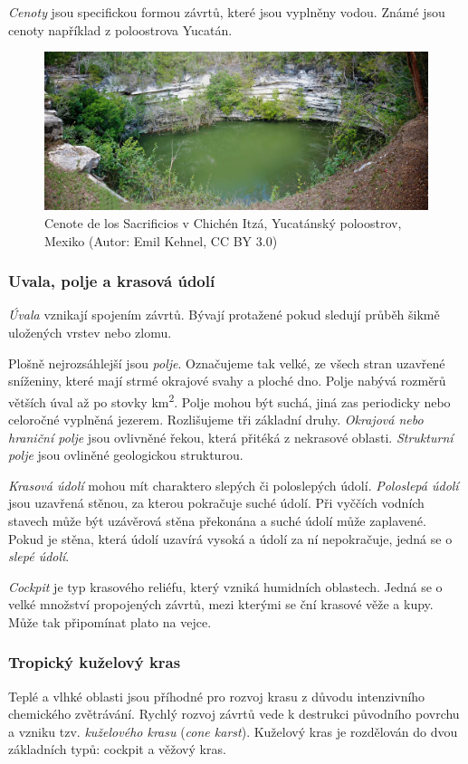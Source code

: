 \emph{Cenoty} jsou specifickou formou závrtů, které jsou vyplněny vodou. Známé jsou cenoty například z poloostrova Yucatán.

\begin{figure}[h]
	\centering
	\includegraphics[width=1\linewidth]{obrazky/karst/Mexico_Cenotes}
	\caption{Cenote de los Sacrificios v Chichén Itzá, Yucatánský poloostrov, Mexiko (Autor: Emil Kehnel, CC BY 3.0)}
\end{figure}

\subsubsection{Uvala, polje a krasová údolí}
\emph{Úvala} vznikají spojením závrtů. Bývají protažené pokud sledují průběh šikmě uložených vrstev nebo zlomu. 

Plošně nejrozsáhlejší jsou \emph{polje}. Označujeme tak velké, ze všech stran uzavřené sníženiny, které mají strmé okrajové svahy a ploché dno. Polje nabývá rozměrů větších úval až po stovky \si{\kilo\metre\squared}. Polje mohou být suchá, jiná zas periodicky nebo celoročné vyplněná jezerem. Rozlišujeme tři základní druhy. \emph{Okrajová nebo hraniční polje} jsou ovlivněné řekou, která přitéká z nekrasové oblasti. \emph{Strukturní polje} jsou ovliněné geologickou strukturou.   

\emph{Krasová údolí} mohou mít charaktero slepých či poloslepých údolí. \emph{Poloslepá údolí} jsou uzavřená stěnou, za kterou pokračuje suché údolí. Při vyččích vodních stavech může být uzávěrová stěna překonána a suché údolí může zaplavené. Pokud je stěna, která údolí uzavírá vysoká a údolí za ní nepokračuje, jedná se o \emph{slepé údolí}.

\emph{Cockpit} je typ krasového reliéfu, který vzniká humidních oblastech. Jedná se o velké množství propojených závrtů, mezi kterými se ční krasové věže a kupy. Může tak připomínat plato na vejce. 

\subsubsection{Tropický kuželový kras}
Teplé a vlhké oblasti jsou příhodné pro rozvoj krasu z důvodu intenzivního chemického zvětrávání. Rychlý rozvoj závrtů vede k destrukci původního povrchu a vzniku tzv. \emph{kuželového krasu} (\textit{cone karst}). Kuželový kras je rozdělován do dvou základních typů: cockpit a věžový kras.

